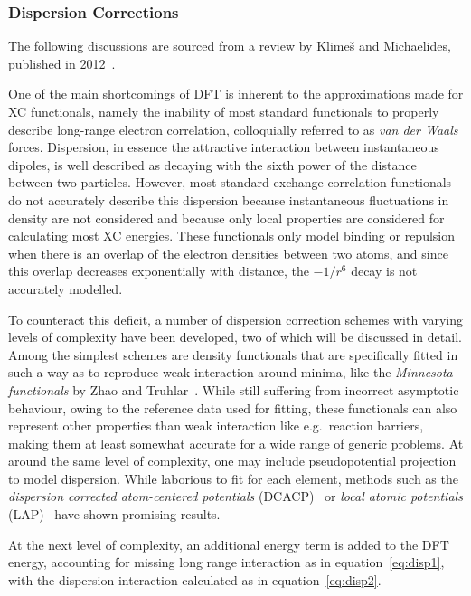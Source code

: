 \documentclass[11pt]{article}
\begin{document}
\subsubsection{Dispersion Corrections}
The following discussions are sourced from a review by Klimeš and Michaelides, published in 2012~\cite{Klime2012}.
\\ \par \noindent One of the main shortcomings of DFT is inherent to the approximations made for XC functionals, namely the inability of most standard functionals to properly describe long-range electron correlation, colloquially referred to as \textit{van der Waals} forces.
Dispersion, in essence the attractive interaction between instantaneous dipoles, is well described as decaying with the sixth power of the distance between two particles.
However, most standard exchange-correlation functionals do not accurately describe this dispersion because instantaneous fluctuations in density are not considered and because only local properties are considered for calculating most XC energies.
These functionals only model binding or repulsion when there is an overlap of the electron densities between two atoms, and since this overlap decreases exponentially with distance, the $-1/r^6$ decay is not accurately modelled.
\\ \par \noindent To counteract this deficit, a number of dispersion correction schemes with varying levels of complexity have been developed, two of which will be discussed in detail.
Among the simplest schemes are density functionals that are specifically fitted in such a way as to reproduce weak interaction around minima, like the \textit{Minnesota functionals} by Zhao and Truhlar~\cite{Zhao2007-oa}.
While still suffering from incorrect asymptotic behaviour, owing to the reference data used for fitting, these functionals can also represent other properties than weak interaction like e.g.~reaction barriers, making them at least somewhat accurate for a wide range of generic problems.
At around the same level of complexity, one may include pseudopotential projection to model dispersion.
While laborious to fit for each element, methods such as the \textit{dispersion corrected atom-centered potentials} (DCACP)~\cite{vonLilienfeld2004} or \textit{local atomic potentials} (LAP)~\cite{Sun2008} have shown promising results.
\\ \par \noindent At the next level of complexity, an additional energy term is added to the DFT energy, accounting for missing long range interaction as in equation~\ref{eq:disp1}, with the dispersion interaction calculated as in equation~\ref{eq:disp2}.
\end{document}
